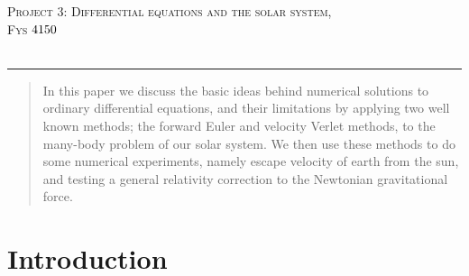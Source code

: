 \documentclass[a4paper,11pt]{article}
\newcommand*{\boisik}{\fontfamily{bsk}\selectfont} %
\begin{document}
{
\SetBgVshift{-1.2cm}
\SetBgHshift{-10.5cm}
$$\:$$
\begin{center}
	\vspace{0.2cm}%
	\fontsize{15}{15}\selectfont \textsc{ Project 3: Differential equations and the solar system},\\
	\fontsize{13}{13}\selectfont \textsc{Fys $\textnormal{{4150}}$ }\\
	\vspace{0.4cm}
	\fontsize{12}{12}\\
	\vspace{0.5cm}
\end{center}
	
\rule{\textwidth}{0.3pt}\par
		
\begin{abstract}
	In this paper we discuss the basic ideas behind numerical solutions to ordinary differential equations, and their limitations by applying two well known methods; the forward Euler and velocity Verlet methods, to the many-body problem of our solar system. We then use these methods to do some numerical experiments, namely escape velocity of earth from the sun, and testing a general relativity correction to the Newtonian gravitational force. 
\end{abstract}



		
\section*{Introduction}

}
\end{document}

